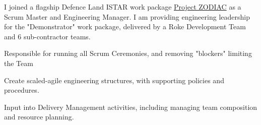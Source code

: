 {}
I joined a flagship Defence Land ISTAR work package \href{https://www.roke.co.uk/news/digitising-land-tactical-istar}{Project ZODIAC} as a Scrum Master and Engineering Manager. I am providing engineering leadership for the "Demonstrator" work package, delivered by a Roke Development Team and 6 sub-contractor teams.
\vspace{0.25em}
\begin{tightemize}
  \item Responsible for running all Scrum Ceremonies, and removing "blockers" limiting the Team
  \item Create scaled-agile engineering structures, with supporting policies and procedures.
  \item Input into Delivery Management activities, including managing team composition and resource planning.
\end{tightemize}
\sectionsep
